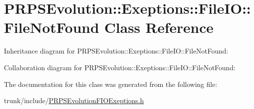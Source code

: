 \hypertarget{class_p_r_p_s_evolution_1_1_exeptions_1_1_file_i_o_1_1_file_not_found}{\section{P\-R\-P\-S\-Evolution\-:\-:Exeptions\-:\-:File\-I\-O\-:\-:File\-Not\-Found Class Reference}
\label{class_p_r_p_s_evolution_1_1_exeptions_1_1_file_i_o_1_1_file_not_found}
}


Inheritance diagram for P\-R\-P\-S\-Evolution\-:\-:Exeptions\-:\-:File\-I\-O\-:\-:File\-Not\-Found\-:


Collaboration diagram for P\-R\-P\-S\-Evolution\-:\-:Exeptions\-:\-:File\-I\-O\-:\-:File\-Not\-Found\-:


The documentation for this class was generated from the following file\-:\begin{DoxyCompactItemize}
\item 
trunk/include/\hyperlink{_p_r_p_s_evolution_f_i_o_exeptions_8h}{P\-R\-P\-S\-Evolution\-F\-I\-O\-Exeptions.\-h}\end{DoxyCompactItemize}
